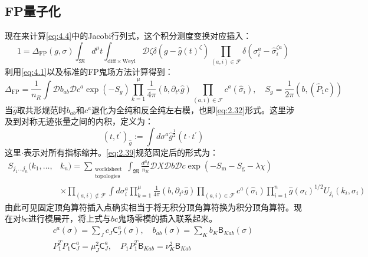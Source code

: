 \subsection{FP量子化}
现在来计算\ref{eq:4.4}中的Jacobi行列式，这个积分测度变换对应插入：
\begin{equation}
	1=\Delta_{\mathrm{FP}}(g,\sigma)\int_\mathfrak{M}d^\mu t\int_\mathrm{diff\times Weyl}\mathcal{D}\zeta\delta(g-\hat{g}(t)^\zeta)\prod_{(a,i)\in \mathcal{F}}\delta(\sigma_i^a-\hat{\sigma}_i^{\zeta a})
\end{equation}
利用\ref{eq:4.1}以及标准的FP鬼场方法计算得到：
\begin{equation}
	\label{eq:4.16}
	\Delta_{\text{FP}}=\frac{1}{n_R}\int\mathcal{D}b_{ab}\mathcal{D}c^a\exp(-S_g)\prod_{k=1}^\mu\frac{1}{4\pi}(b,\partial_{t^k}\hat{g})\prod_{(a,i)\in \mathcal{F}}c^a(\hat{\sigma}_i),\quad S_g=\frac{1}{2\pi}\left(b,(\hat{P}_1c)\right)
\end{equation}
当$\hat g$取共形规范时$b_{ab}$和$c^a$退化为全纯和反全纯左右模，也即\ref{eq:2.32}形式。这里涉及到对称无迹张量之间的内积，定义为：
\begin{equation}
	\label{eq:4.17}
	(t,t^\prime)_{\hat g}:=\int d\sigma^a {\hat g}^{\frac{1}{2}} (t\cdot t^\prime)
\end{equation}
这里$\cdot$表示对所有指标缩并。\ref{eq:2.39}规范固定后的形式为：
\begin{equation}
	\label{eq:4.18}
	\begin{aligned}
		S_{j_1...j_n}(k_1,\ldots,&k_n)=\sum_{\substack{\text{worldsheet}\\\text{topologies}}}\int_{\mathfrak{M}}\frac{d^\mu t}{n_R}\mathcal{D}X\mathcal{D}b\mathcal{D}c\exp(-S_\mathrm{m}-S_\mathrm{g}-\lambda\chi)\\&\times\prod_{(a,i)\notin \mathcal{F}}\int d\sigma_i^a\prod_{k=1}^\mu\frac{1}{4\pi}(b,\partial_{t^k}\hat{g})\prod_{(a,i)\in\mathcal{F}}c^a(\hat{\sigma}_i)\prod_{i=1}^n\hat{g}(\sigma_i)^{1/2}U_{j_i}(k_i,\sigma_i)
	\end{aligned}
\end{equation}
由此可见固定顶角算符插入点确实相当于将无积分顶角算符换为积分顶角算符。现在对$bc$进行模展开，将上式与$bc$鬼场零模的插入联系起来。
\begin{equation}
	\label{eq:4.19}
	\begin{gathered}
		c^a(\sigma)=\sum_Jc_J\mathsf{C}_J^a(\sigma),\quad b_{ab}(\sigma)=\sum_Kb_K\mathsf{B}_{Kab}(\sigma)\\
		P_1^TP_1\mathsf{C}_J^a=\mu_J^{2}\mathsf{C}_J^a,\quad P_1P_1^T\mathsf{B}_{Kab}=\nu_K^2\mathsf{B}_{Kab}
	\end{gathered}
\end{equation}
